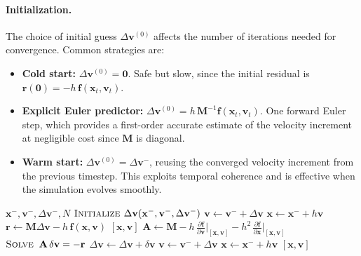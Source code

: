 \documentclass{article}
\newcommand{\pdc}[2]{\frac{\partial #1}{\partial #2}}
\begin{document}
\paragraph{Initialization.} The choice of initial guess $\Delta\mathbf{v}^{(0)}$ affects the number of iterations needed for convergence. Common strategies are:
\begin{itemize}
    \item \textbf{Cold start:} $\Delta\mathbf{v}^{(0)} = \mathbf{0}$. Safe but slow, since the initial residual is $\mathbf{r}(\mathbf{0}) = -h\,\mathbf{f}(\mathbf{x}_t, \mathbf{v}_t)$.
    \item \textbf{Explicit Euler predictor:} $\Delta\mathbf{v}^{(0)} = h\,\mathbf{M}^{-1}\mathbf{f}(\mathbf{x}_t, \mathbf{v}_t)$. One forward Euler step, which provides a first-order accurate estimate of the velocity increment at negligible cost since $\mathbf{M}$ is diagonal.
    \item \textbf{Warm start:} $\Delta\mathbf{v}^{(0)} = \Delta\mathbf{v}^-$, reusing the converged velocity increment from the previous timestep. This exploits temporal coherence and is effective when the simulation evolves smoothly.
\end{itemize}

\begin{algorithm}[H]
\caption{Newton-Raphson method applied to discretized equations of motion for deformable bodies.}
\label{alg:eq_motion_newton_raphson}
\begin{algorithmic}[1]
\addtolength{\itemsep}{0.5ex}
{$\mathbf{x}^-, \mathbf{v}^-, \Delta \mathbf{v}^-, N$}
    \State $\textsc{Initialize } \Delta\mathbf{v}(\mathbf{x}^-, \mathbf{v}^-, \Delta \mathbf{v}^-)$
    \State $\mathbf{v} \gets \mathbf{v}^- + \Delta \mathbf{v}$
    \State $\mathbf{x} \gets \mathbf{x}^- + h \mathbf{v}$
        \State $\mathbf{r} \gets \mathbf{M}\Delta\mathbf{v} - h\,\mathbf{f}(\mathbf{x}, \mathbf{v})$
            \State \Return $[\mathbf{x}, \mathbf{v}]$
        \EndIf
        \State $\mathbf{A} \gets \mathbf{M}  - h\, \pdc{\mathbf{f}}{\mathbf{v}}\big|_{[\mathbf{x}, \mathbf{v}]} - h^2\, \pdc{\mathbf{f}}{\mathbf{x}}\big|_{[\mathbf{x}, \mathbf{v}]}$
        \State $\textsc{Solve}\;\; \mathbf{A}\, \delta\mathbf{v} = -\mathbf{r}$
        \State $\Delta \mathbf{v} \gets \Delta \mathbf{v} + \delta\mathbf{v}$
        \State $\mathbf{v} \gets \mathbf{v}^- + \Delta \mathbf{v}$
        \State $\mathbf{x} \gets \mathbf{x}^- + h \mathbf{v}$
    \EndFor
    \State \Return $[\mathbf{x}, \mathbf{v}]$
\EndFunction
\end{algorithmic}
\end{algorithm}
\end{document}
